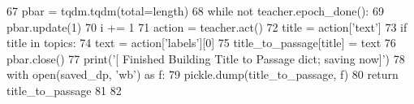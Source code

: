 \begin{DoxyCode}
67     pbar = tqdm.tqdm(total=length)
68     \textcolor{keywordflow}{while} \textcolor{keywordflow}{not} teacher.epoch\_done():
69         pbar.update(1)
70         i += 1
71         action = teacher.act()
72         title = action[\textcolor{stringliteral}{'text'}]
73         \textcolor{keywordflow}{if} title \textcolor{keywordflow}{in} topics:
74             text = action[\textcolor{stringliteral}{'labels'}][0]
75             title\_to\_passage[title] = text
76     pbar.close()
77     print(\textcolor{stringliteral}{'[ Finished Building Title to Passage dict; saving now]'})
78     with open(saved\_dp, \textcolor{stringliteral}{'wb'}) \textcolor{keyword}{as} f:
79         pickle.dump(title\_to\_passage, f)
80     \textcolor{keywordflow}{return} title\_to\_passage
81 
82 
\end{DoxyCode}
